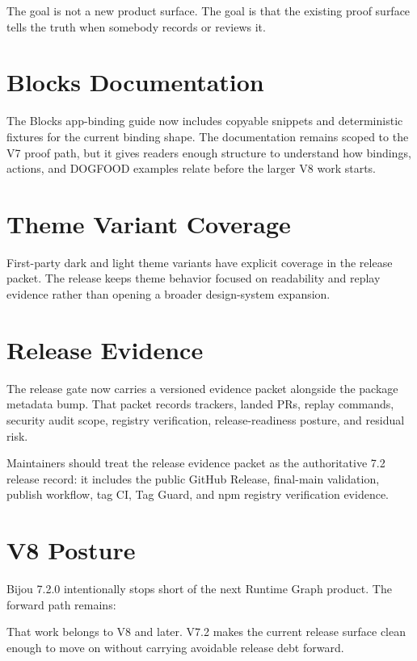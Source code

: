 The goal is not a new product surface. The goal is that the existing proof surface tells the truth when somebody records or reviews it.

\section{Blocks Documentation}\label{record-283-blocks-documentation}

The Blocks app-binding guide now includes copyable snippets and deterministic fixtures for the current binding shape. The documentation remains scoped to the V7 proof path, but it gives readers enough structure to understand how bindings, actions, and DOGFOOD examples relate before the larger V8 work starts.

\section{Theme Variant Coverage}\label{record-283-theme-variant-coverage}

First-party dark and light theme variants have explicit coverage in the release packet. The release keeps theme behavior focused on readability and replay evidence rather than opening a broader design-system expansion.

\section{Release Evidence}\label{record-283-release-evidence}

The release gate now carries a versioned evidence packet alongside the package metadata bump. That packet records trackers, landed PRs, replay commands, security audit scope, registry verification, release-readiness posture, and residual risk.

Maintainers should treat the release evidence packet as the authoritative 7.2 release record: it includes the public GitHub Release, final-main validation, publish workflow, tag CI, Tag Guard, and npm registry verification evidence.

\section{V8 Posture}\label{record-283-v8-posture}

Bijou 7.2.0 intentionally stops short of the next Runtime Graph product. The forward path remains:



That work belongs to V8 and later. V7.2 makes the current release surface clean enough to move on without carrying avoidable release debt forward.

